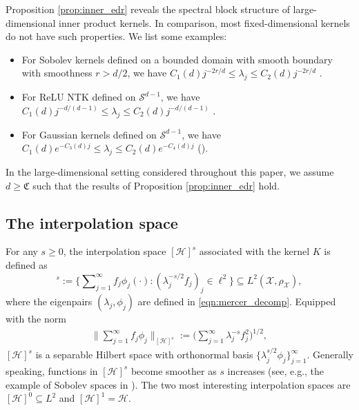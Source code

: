 \documentclass{article}
\theoremstyle{plain}
\theoremstyle{definition}
\theoremstyle{remark}
\newcommand{\calH}{\mathcal{H}}
\newcommand{\dhnote}[1]{{\color{red}[#1]} } %
\begin{document}
Proposition \ref{prop:inner_edr} reveals the spectral block structure of large-dimensional inner product kernels. 
In comparison, most fixed-dimensional kernels do not have such properties. We list some examples:
\begin{itemize}
    \item  For Sobolev kernels defined on a bounded domain with smooth boundary with smoothness $r>d/2$, we have $C_1(d) j^{-2r/d} \leq \lambda_j \leq C_2(d) j^{-2r/d}$ \citep{edmunds1996function, zhang2023optimality}.


    \item For ReLU NTK defined on $\mathcal{S}^{d-1}$, we have $C_1(d) j^{-d/(d-1)} \leq \lambda_j \leq C_2(d) j^{-d/(d-1)}$ \citep{Bietti_on_2019, Bietti_deep_2021}.


    \item  For Gaussian kernels defined on $\mathcal{S}^{d-1}$, we have $C_1(d) e^{-C_3(d) j} \leq \lambda_j \leq C_2(d) e^{-C_4(d) j}$ (\cite{Minh_Mercer_2006}).
\end{itemize}


In the large-dimensional setting considered throughout this paper, we assume $d \geq \mathfrak{C}$ such that the results of Proposition \ref{prop:inner_edr} hold. 





\subsection{The interpolation space}\label{subsec:interpolation_space}

For any $s \geq 0$, the interpolation space $[\mathcal{H}]^s$ associated with the kernel $K$ is defined as
\begin{equation*}
  [\mathcal{H}]^s := 
  \Big\{
  \sum\nolimits_{j=1}^{\infty} f_j \phi_{j}(\cdot): \left(\lambda_j^{-s / 2} f_j\right)_{j} \in \ell^2 
  \Big\} 
  \subseteq L^{2}(\mathcal{X}, \rho_{\mathcal{X}}),
\end{equation*}
where the eigenpairs $(\lambda_j, \phi_j)$ are defined in \eqref{eqn:mercer_decomp}. 
Equipped with the norm
\begin{equation*}\begin{aligned}
\Big\|\sum\nolimits_{j=1}^{\infty} f_j  \phi_j
\Big\|_{[\mathcal{H}]^s} :=
\Big(\sum\nolimits_{j=1}^{\infty} \lambda_j^{-s} f_j^2
\Big)^{1 / 2}, 
\end{aligned}
\end{equation*}
$[\mathcal{H}]^s $ is a separable Hilbert space with orthonormal basis $ \{\lambda_{j}^{s/2} \phi_{j}\}_{j=1}^\infty$. 
Generally speaking, functions in $[\mathcal{H}]^s$ become smoother as $s$ increases (see, e.g., the example of Sobolev spaces in \cite{edmunds1996function, zhang2023optimality}). 
The two most interesting interpolation spaces are $[\calH]^{0} \subseteq L^{2}$ and $[\calH]^{1} = \calH$. 
\end{document}
